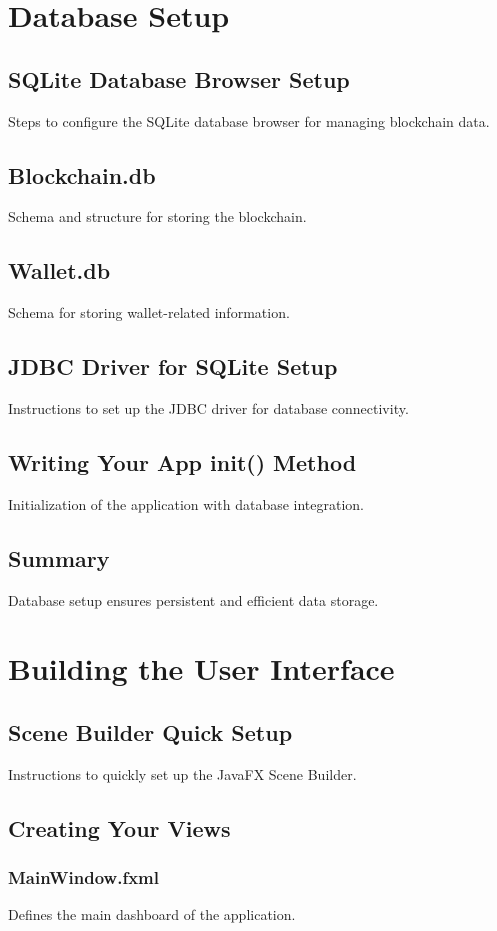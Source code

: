 \documentclass[12pt,a4paper]{report}
\begin{document}
\chapter{Database Setup}
\section{SQLite Database Browser Setup}
Steps to configure the SQLite database browser for managing blockchain data.
\section{Blockchain.db}
Schema and structure for storing the blockchain.
\section{Wallet.db}
Schema for storing wallet-related information.
\section{JDBC Driver for SQLite Setup}
Instructions to set up the JDBC driver for database connectivity.
\section{Writing Your App init() Method}
Initialization of the application with database integration.
\section{Summary}
Database setup ensures persistent and efficient data storage.

\chapter{Building the User Interface}
\section{Scene Builder Quick Setup}
Instructions to quickly set up the JavaFX Scene Builder.
\section{Creating Your Views}
\subsection{MainWindow.fxml}
Defines the main dashboard of the application.
\end{document}
